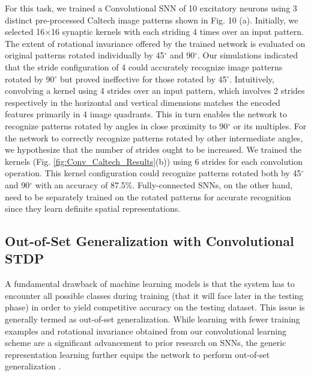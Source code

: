 \documentclass[journal, onecolumn]{IEEEtran}
\begin{document}
For this task, we trained a Convolutional SNN of 10 excitatory neurons using 3 distinct pre-processed Caltech image patterns shown in Fig. 10 (a). Initially, we selected 16$\times$16 synaptic kernels with each striding 4 times over an input pattern. The extent of rotational invariance offered by the trained network is evaluated on original patterns rotated individually by 45$^\circ$ and 90$^\circ$. Our simulations indicated that the stride configuration of 4 could accurately recognize image patterns rotated by 90$^\circ$ but proved ineffective for those rotated by 45$^\circ$. Intuitively, convolving a kernel using 4 strides over an input pattern, which involves 2 strides respectively in the horizontal and vertical dimensions matches the encoded features primarily in 4 image quadrants. This in turn enables the network to recognize patterns rotated by angles in close proximity to 90$^\circ$ or its multiples. For the network to correctly recognize patterns rotated by other intermediate angles, we hypothesize that the number of strides ought to be increased. We trained the kernels (Fig. \ref{fig:Conv_Caltech_Results}(b)) using 6 strides for each convolution operation. This kernel configuration could recognize patterns rotated both by 45$^\circ$ and 90$^\circ$ with an accuracy of 87.5\%. Fully-connected SNNs, on the other hand, need to be separately trained on the rotated patterns for accurate recognition since they learn definite spatial representations.

\subsection*{\normalsize\bf{Out-of-Set Generalization with Convolutional STDP}}
A fundamental drawback of machine learning models is that the system has to encounter all possible classes during training (that it will face later in the testing phase) in order to yield competitive accuracy on the testing dataset. This issue is generally termed as out-of-set generalization. While learning with fewer training examples and rotational invariance obtained from our convolutional learning scheme are a significant advancement to prior research on SNNs, the generic representation learning further equips the network to perform out-of-set generalization \cite{cox2014neural}.
\end{document}
